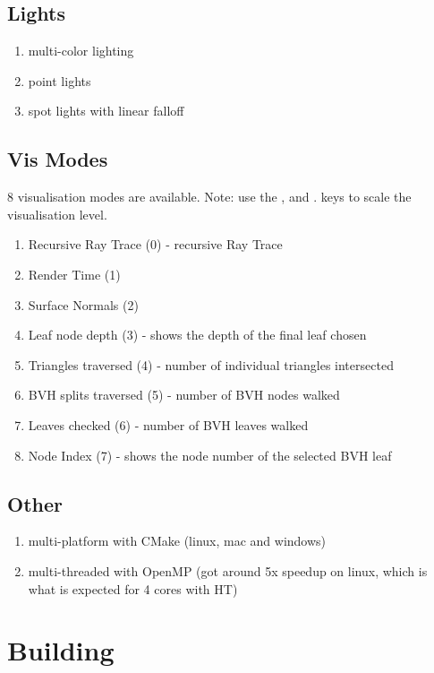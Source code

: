 \subsection{Lights}
    \begin{enumerate}
    \item multi-color lighting
    \item point lights
    \item spot lights with linear falloff
    \end{enumerate}

\subsection{Vis Modes}
    8 visualisation modes are available. Note: use the , and . keys to scale the visualisation level.
    \begin{enumerate}
    \item Recursive Ray Trace  (0) - recursive Ray Trace
    \item Render Time (1)
    \item Surface Normals (2) 
    \item Leaf node depth (3) - shows the depth of the final leaf chosen
    \item Triangles traversed (4) - number of individual triangles intersected
    \item BVH splits traversed (5) - number of BVH nodes walked
    \item Leaves checked (6) - number of BVH leaves walked
    \item Node Index (7) - shows the node number of the selected BVH leaf
    \end{enumerate}

\subsection{Other}
    \begin{enumerate}
    \item multi-platform with CMake (linux, mac and windows)
    \item multi-threaded with OpenMP (got around 5x speedup on linux, which is what is expected for 4 cores with HT)
    \end{enumerate}

\section{Building}

